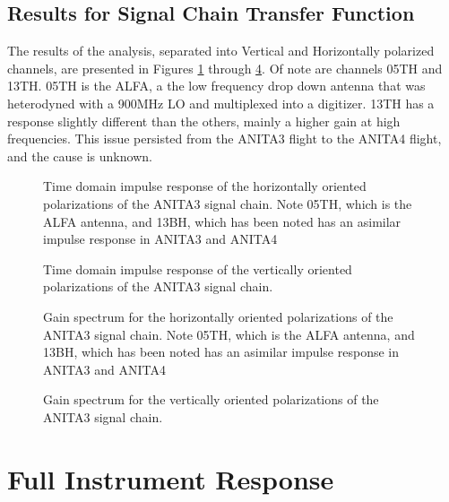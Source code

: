 	
	\subsection{Results for Signal Chain Transfer Function}
		The results of the analysis, separated into Vertical and Horizontally polarized channels, are presented in Figures \ref{fig:sigChain_timeH} through \ref{fig:sigChain_fftV}.  Of note are channels 05TH and 13TH.  05TH is the ALFA, a the low frequency drop down antenna that was heterodyned with a 900MHz LO and multiplexed into a digitizer.  13TH has a response slightly different than the others, mainly a higher gain at high frequencies.  This issue persisted from the ANITA3 flight to the ANITA4 flight, and the cause is unknown.
		
		
\begin{figure}
\centering
{}
	\caption{Time domain impulse response of the horizontally oriented polarizations of the ANITA3 signal chain.  Note 05TH, which is the ALFA antenna, and 13BH, which has been noted has an asimilar impulse response in ANITA3 and ANITA4}
\label{fig:sigChain_timeH}
\end{figure}

\begin{figure}
\centering
{}
	\caption{Time domain impulse response of the vertically oriented polarizations of the ANITA3 signal chain.}
\label{fig:sigChain_timeV}
\end{figure}

\begin{figure}
\centering
{}
	\caption{Gain spectrum for the horizontally oriented polarizations of the ANITA3 signal chain.  Note 05TH, which is the ALFA antenna, and 13BH, which has been noted has an asimilar impulse response in ANITA3 and ANITA4}
\label{fig:sigChain_fftH}
\end{figure}

\begin{figure}
\centering
{}
	\caption{Gain spectrum for the vertically oriented polarizations of the ANITA3 signal chain.}
\label{fig:sigChain_fftV}
\end{figure}
	

\section{Full Instrument Response}

